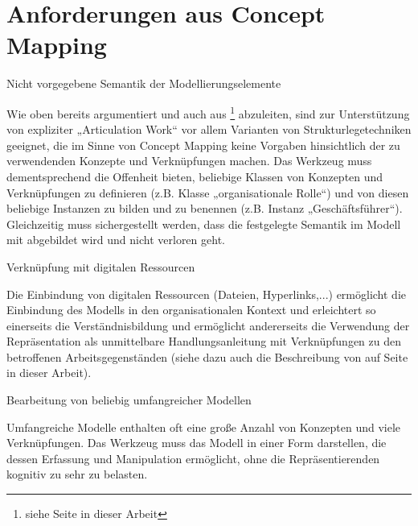 \section{Anforderungen aus Concept Mapping} %
\label{sec:anforderungen_aus_concept_mapping}

\begin{anf}
	\label{anf:nicht_vorgegebene_semantik_der_modellierungselemente}
	Nicht vorgegebene Semantik der Modellierungselemente
\end{anf}

Wie oben bereits argumentiert und auch aus \citet{Seel91}\footnote{siehe Seite \pageref{anforderungen_seel} in dieser Arbeit} abzuleiten, sind zur Unterstützung von expliziter „Articulation Work“ vor allem Varianten von Strukturlegetechniken geeignet, die im Sinne von Concept Mapping keine Vorgaben hinsichtlich der zu verwendenden Konzepte und Verknüpfungen machen. Das Werkzeug muss dementsprechend die Offenheit bieten, beliebige Klassen von Konzepten und Verknüpfungen zu definieren (z.B. Klasse „organisationale Rolle“) und von diesen beliebige Instanzen zu bilden und zu benennen (z.B. Instanz „Geschäftsführer“). Gleichzeitig muss sichergestellt werden, dass die festgelegte Semantik im Modell mit abgebildet wird und nicht verloren geht.


\begin{anf}
	\label{anf:verknüpfung_mit_digitalen_ressourcen}
	Verknüpfung mit digitalen Ressourcen
\end{anf}

Die Einbindung von digitalen Ressourcen (Dateien, Hyperlinks,...) ermöglicht die Einbindung des Modells in den organisationalen Kontext und erleichtert so einerseits die Verständnisbildung und ermöglicht andererseits die Verwendung der Repräsentation als unmittelbare Handlungsanleitung mit Verknüpfungen zu den betroffenen Arbeitsgegenständen (siehe dazu auch die Beschreibung von \citep{Jorgensen04} auf Seite \pageref{steps:jorgensen} in dieser Arbeit).


\begin{anf}
	\label{anf:bearbeitung_von_beliebig_komplexen_modellen}
	Bearbeitung von beliebig umfangreicher Modellen
\end{anf}

Umfangreiche Modelle enthalten oft eine große Anzahl von Konzepten und viele Verknüpfungen. Das Werkzeug muss das Modell in einer Form darstellen, die dessen Erfassung und Manipulation ermöglicht, ohne die Repräsentierenden kognitiv zu sehr zu belasten.

